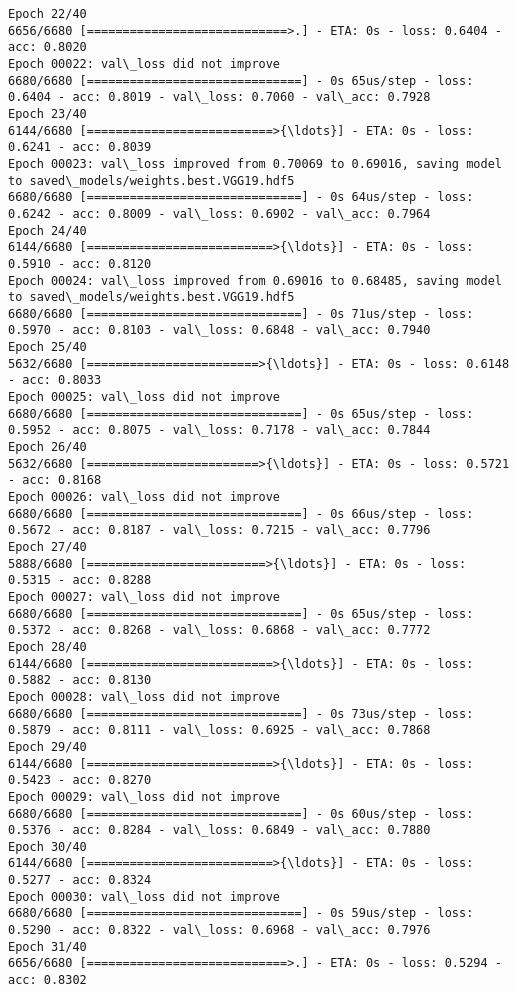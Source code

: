 \documentclass[11pt]{article}
\begin{document}
\begin{Verbatim}[commandchars=\\\{\}]
Epoch 22/40
6656/6680 [============================>.] - ETA: 0s - loss: 0.6404 - acc: 0.8020
Epoch 00022: val\_loss did not improve
6680/6680 [==============================] - 0s 65us/step - loss: 0.6404 - acc: 0.8019 - val\_loss: 0.7060 - val\_acc: 0.7928
Epoch 23/40
6144/6680 [==========================>{\ldots}] - ETA: 0s - loss: 0.6241 - acc: 0.8039
Epoch 00023: val\_loss improved from 0.70069 to 0.69016, saving model to saved\_models/weights.best.VGG19.hdf5
6680/6680 [==============================] - 0s 64us/step - loss: 0.6242 - acc: 0.8009 - val\_loss: 0.6902 - val\_acc: 0.7964
Epoch 24/40
6144/6680 [==========================>{\ldots}] - ETA: 0s - loss: 0.5910 - acc: 0.8120
Epoch 00024: val\_loss improved from 0.69016 to 0.68485, saving model to saved\_models/weights.best.VGG19.hdf5
6680/6680 [==============================] - 0s 71us/step - loss: 0.5970 - acc: 0.8103 - val\_loss: 0.6848 - val\_acc: 0.7940
Epoch 25/40
5632/6680 [========================>{\ldots}] - ETA: 0s - loss: 0.6148 - acc: 0.8033
Epoch 00025: val\_loss did not improve
6680/6680 [==============================] - 0s 65us/step - loss: 0.5952 - acc: 0.8075 - val\_loss: 0.7178 - val\_acc: 0.7844
Epoch 26/40
5632/6680 [========================>{\ldots}] - ETA: 0s - loss: 0.5721 - acc: 0.8168
Epoch 00026: val\_loss did not improve
6680/6680 [==============================] - 0s 66us/step - loss: 0.5672 - acc: 0.8187 - val\_loss: 0.7215 - val\_acc: 0.7796
Epoch 27/40
5888/6680 [=========================>{\ldots}] - ETA: 0s - loss: 0.5315 - acc: 0.8288
Epoch 00027: val\_loss did not improve
6680/6680 [==============================] - 0s 65us/step - loss: 0.5372 - acc: 0.8268 - val\_loss: 0.6868 - val\_acc: 0.7772
Epoch 28/40
6144/6680 [==========================>{\ldots}] - ETA: 0s - loss: 0.5882 - acc: 0.8130
Epoch 00028: val\_loss did not improve
6680/6680 [==============================] - 0s 73us/step - loss: 0.5879 - acc: 0.8111 - val\_loss: 0.6925 - val\_acc: 0.7868
Epoch 29/40
6144/6680 [==========================>{\ldots}] - ETA: 0s - loss: 0.5423 - acc: 0.8270
Epoch 00029: val\_loss did not improve
6680/6680 [==============================] - 0s 60us/step - loss: 0.5376 - acc: 0.8284 - val\_loss: 0.6849 - val\_acc: 0.7880
Epoch 30/40
6144/6680 [==========================>{\ldots}] - ETA: 0s - loss: 0.5277 - acc: 0.8324
Epoch 00030: val\_loss did not improve
6680/6680 [==============================] - 0s 59us/step - loss: 0.5290 - acc: 0.8322 - val\_loss: 0.6968 - val\_acc: 0.7976
Epoch 31/40
6656/6680 [============================>.] - ETA: 0s - loss: 0.5294 - acc: 0.8302

\end{Verbatim}
\end{document}
